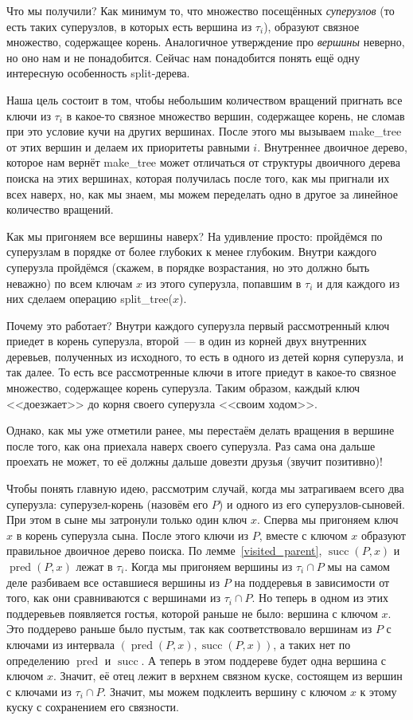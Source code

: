 Что мы получили? Как минимум то, что множество посещённых \emph{суперузлов} (то есть таких суперузлов, в которых есть вершина из $\tau_i$), образуют связное множество, содержащее корень. Аналогичное утверждение про \emph{вершины} неверно, но оно нам и не понадобится. Сейчас нам понадобится понять ещё одну интересную особенность split-дерева.

Наша цель состоит в том, чтобы небольшим количеством вращений пригнать все
ключи из $\tau_i$ в какое-то связное множество вершин, содержащее корень,
не сломав при это условие кучи на других вершинах.
После этого мы вызываем \textrm{make\_tree} от этих вершин и делаем их приоритеты
равными $i$. Внутреннее двоичное дерево, которое нам вернёт \textrm{make\_tree}
может отличаться от структуры двоичного дерева поиска на этих вершинах, которая получилась после того, как мы пригнали их всех наверх, но, как мы знаем, мы можем переделать одно в другое за линейное количество вращений.

Как мы пригоняем все вершины наверх? На удивление просто: пройдёмся по суперузлам в порядке от более глубоких к менее глубоким. Внутри каждого суперузла пройдёмся (скажем, в порядке возрастания, но это должно быть неважно) по всем ключам $x$ из этого суперузла, попавшим в $\tau_i$ и для каждого из них сделаем операцию
\textrm{split\_tree}($x$).

Почему это работает? Внутри каждого суперузла первый рассмотренный ключ приедет в корень суперузла, второй~--- в один из корней двух внутренних деревьев, полученных из исходного, то есть в одного из детей корня суперузла, и так далее. То есть все рассмотренные ключи в итоге приедут в какое-то связное множество, содержащее корень суперузла. Таким образом, каждый ключ <<доезжает>> до корня своего суперузла <<своим ходом>>.

Однако, как мы уже отметили ранее, мы перестаём делать вращения в вершине после того, как она приехала наверх своего суперузла. Раз сама она дальше проехать не может, то её должны
дальше довезти друзья (звучит позитивно)!

Чтобы понять главную идею, рассмотрим случай, когда мы затрагиваем всего два суперузла: суперузел-корень (назовём его $P$) и одного из его суперузлов-сыновей. При этом в сыне мы затронули только один ключ $x$. Сперва мы пригоняем ключ $x$ в корень суперузла сына.
После этого ключи из $P$, вместе с ключом $x$ образуют правильное двоичное дерево поиска.
По лемме~\ref{visited_parent}, $\operatorname{succ}(P, x)$ и $\operatorname{pred}(P, x)$ лежат в $\tau_i$. Когда мы пригоняем вершины из $\tau_i \cap P$ мы на самом деле разбиваем все оставшиеся вершины из $P$ на поддеревья в зависимости от того, как они сравниваются с вершинами из $\tau_i \cap P$. Но теперь в одном из этих поддеревьев появляется гостья, которой раньше не было: вершина с ключом $x$. Это поддерево раньше было пустым, так как соответствовало вершинам из $P$ с ключами из интервала $(\operatorname{pred}(P, x), \operatorname{succ}(P, x))$, а таких нет по определению $\operatorname{pred}$ и $\operatorname{succ}$. А теперь в этом поддереве будет одна вершина с ключом $x$. Значит, её отец лежит в верхнем связном куске, состоящем из вершин с ключами из $\tau_i \cap P$. Значит, мы можем подклеить вершину с ключом $x$ к этому куску с сохранением его связности.

